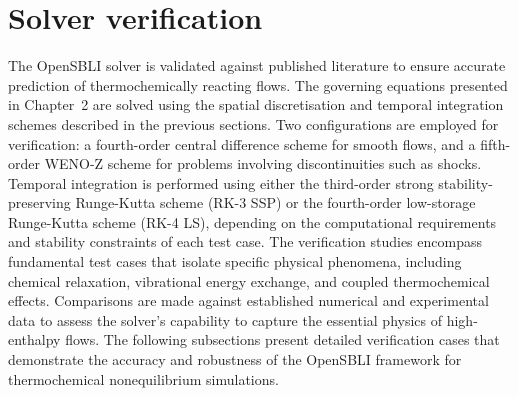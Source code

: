 






\section{Solver verification}

The OpenSBLI solver is validated against published literature to ensure accurate prediction of thermochemically reacting flows. The governing equations presented in Chapter~2 are solved using the spatial discretisation and temporal integration schemes described in the previous sections. Two configurations are employed for verification: a fourth-order central difference scheme for smooth flows, and a fifth-order WENO-Z scheme for problems involving discontinuities such as shocks. Temporal integration is performed using either the third-order strong stability-preserving Runge-Kutta scheme (RK-3 SSP) or the fourth-order low-storage Runge-Kutta scheme (RK-4 LS), depending on the computational requirements and stability constraints of each test case. The verification studies encompass fundamental test cases that isolate specific physical phenomena, including chemical relaxation, vibrational energy exchange, and coupled thermochemical effects. Comparisons are made against established numerical and experimental data to assess the solver's capability to capture the essential physics of high-enthalpy flows. The following subsections present detailed verification cases that demonstrate the accuracy and robustness of the OpenSBLI framework for thermochemical nonequilibrium simulations.


